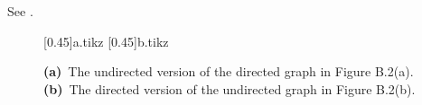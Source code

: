 See .
\begin{figure}[htb]
    \subcaptionbox{\label{fig:B.4-5a}}[0.45\textwidth]{{a.tikz}}
    \subcaptionbox{\label{fig:B.4-5b}}[0.45\textwidth]{{b.tikz}}
    \caption{\textbf{(a)}\, The undirected version of the directed graph in Figure B.2(a).\,
    \textbf{(b)}\, The directed version of the undirected graph in Figure B.2(b).} \label{fig:B.4-5}
\end{figure}
